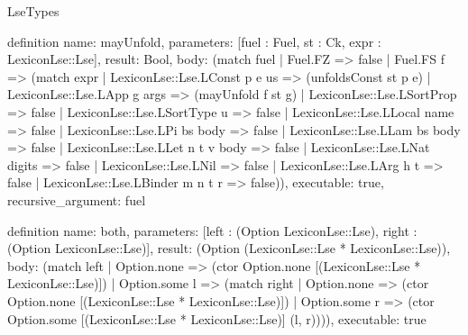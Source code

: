 \begin{lexlean}{LseTypes}
\begin{semanticmodule}
definition{
  name: mayUnfold,
  parameters: [fuel : Fuel, st : Ck, expr : LexiconLse::Lse],
  result: Bool,
  body: (match fuel
    | Fuel.FZ => false
    | Fuel.FS f => (match expr
      | LexiconLse::Lse.LConst p e us => (unfoldsConst st p e)
      | LexiconLse::Lse.LApp g args => (mayUnfold f st g)
      | LexiconLse::Lse.LSortProp => false
      | LexiconLse::Lse.LSortType u => false
      | LexiconLse::Lse.LLocal name => false
      | LexiconLse::Lse.LPi bs body => false
      | LexiconLse::Lse.LLam bs body => false
      | LexiconLse::Lse.LLet n t v body => false
      | LexiconLse::Lse.LNat digits => false
      | LexiconLse::Lse.LNil => false
      | LexiconLse::Lse.LArg h t => false
      | LexiconLse::Lse.LBinder m n t r => false)),
  executable: true,
  recursive_argument: fuel
}

definition{
  name: both,
  parameters: [left : (Option LexiconLse::Lse), right : (Option LexiconLse::Lse)],
  result: (Option (LexiconLse::Lse * LexiconLse::Lse)),
  body: (match left
    | Option.none => (ctor Option.none [(LexiconLse::Lse * LexiconLse::Lse)])
    | Option.some l => (match right
      | Option.none => (ctor Option.none [(LexiconLse::Lse * LexiconLse::Lse)])
      | Option.some r => (ctor Option.some [(LexiconLse::Lse * LexiconLse::Lse)] (l, r)))),
  executable: true
}


\end{semanticmodule}
\end{lexlean}
